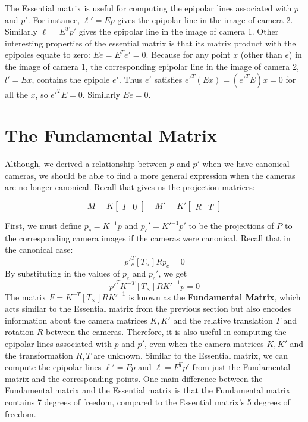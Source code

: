 \documentclass[a4paper, 12pt]{article}
\renewcommand\emph{\textbf}
\begin{document}
The Essential matrix is useful for computing the epipolar lines associated with $p$ and $p'$. For instance, $\ell' = Ep$ gives the epipolar line in the image of camera 2. Similarly $\ell = E^Tp'$ gives the epipolar line in the image of camera 1. Other interesting properties of the essential matrix is that its matrix product with the epipoles equate to zero: $Ee = E^Te' = 0$. 
Because for any point $x$ (other than $e$) in the image of camera 1, the corresponding epipolar line in the image of camera 2, $l'=Ex$, contains the epipole $e'$. Thus $e'$ satisfies $e'^T(Ex) = (e'^TE)x=0$ for all the $x$, so $e'^TE=0$. Similarly $Ee=0$.


\section{The Fundamental Matrix}
Although, we derived a relationship between $p$ and $p'$ when we have canonical cameras, we should be able to find a more general expression when the cameras are no longer canonical. Recall that gives us the projection matrices:

\begin{equation}
    M = K\begin{bmatrix} I & 0\end{bmatrix} \ \ \ \ \ M' = K'\begin{bmatrix}R & T\end{bmatrix}
    \label{eq:projection_matrices2}
\end{equation}

First, we must define $p_c = K^{-1}p$ and $p_c' = K'^{-1}p'$ to be the projections of $P$ to the corresponding camera images if the cameras were canonical. Recall that in the canonical case:
\begin{equation}
    p'^T_c [T_\times]Rp_c = 0
    \label{eq:canonical_constraint}
\end{equation}
By substituting in the values of $p_c$ and $p_c'$, we get
\begin{equation}
    p'^TK^{-T} [T_\times]RK'^{-1}p = 0
    \label{eq:canonical_constraint_substitute}
\end{equation}
The matrix $F = K^{-T} [T_\times]RK'^{-1}$ is known as the \emph{Fundamental Matrix}, which acts similar to the Essential matrix from the previous section but also encodes information about the camera matrices $K, K'$ and the relative translation $T$ and rotation $R$ between the cameras. Therefore, it is also useful in computing the epipolar lines associated with $p$ and $p'$, even when the camera matrices $K, K'$ and the transformation $R,T$ are unknown. Similar to the Essential matrix, we can compute the epipolar lines $\ell' = Fp$ and $\ell = F^T p'$ from just the Fundamental matrix and the corresponding points. One main difference between the Fundamental matrix and the Essential matrix is that the Fundamental matrix contains 7 degrees of freedom, compared to the Essential matrix's 5 degrees of freedom.
\end{document}
